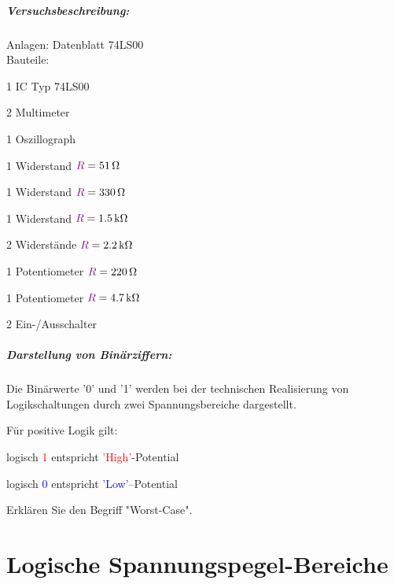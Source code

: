 \documentclass[11pt,a4paper,titlepage,parskip=half]{scrreprt}
\begin{document}
	
  \tableofcontents


      \paragraph{Versuchsbeschreibung:}
        Anlagen: Datenblatt 74LS00\\
        Bauteile:
        \begin{itemize*}
          \item 1 IC Typ 74LS00
          \item 2 Multimeter
          \item 1 Oszillograph
          \item 1 Widerstand $\textcolor{violet}{R} = \SI{51}{\ohm}$
          \item 1 Widerstand $\textcolor{violet}{R} = \SI{330}{\ohm}$
          \item 1 Widerstand $\textcolor{violet}{R} = \SI{1,5}{\kilo\ohm}$
          \item 2 Widerstände $\textcolor{violet}{R} = \SI{2,2}{\kilo\ohm}$
          \item 1 Potentiometer $\textcolor{violet}{R} = \SI{220}{\ohm}$
          \item 1 Potentiometer $\textcolor{violet}{R} = \SI{4,7}{\kilo\ohm}$
          \item 2 Ein-/Ausschalter
        \end{itemize*}
    
      \paragraph{Darstellung von Binärziffern:} Die Binärwerte '0' und '1' werden bei der technischen Realisierung von Logikschaltungen durch zwei Spannungsbereiche dargestellt.
    
        Für positive Logik gilt:
        \begin{itemize*}
          \item logisch \textcolor{red}{1} entspricht \textcolor{red}{'High'}-Potential
          \item logisch \textcolor{blue}{0} entspricht \textcolor{blue}{'Low'}–Potential
        \end{itemize*}
    
        Erklären Sie den Begriff "Worst-Case".
    
       
  \chapter{Logische Spannungspegel-Bereiche}
\end{document}
